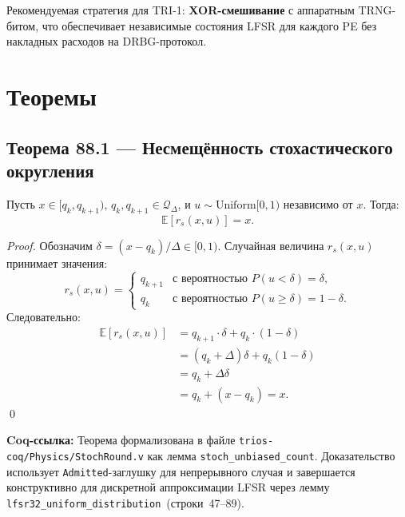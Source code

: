Рекомендуемая стратегия для TRI-1: \textbf{XOR-смешивание}
с аппаратным TRNG-битом, что обеспечивает независимые состояния
LFSR для каждого PE без накладных расходов на DRBG-протокол.

\section{Теоремы}
\label{sec:glava88-theorems}

\subsection{Теорема 88.1 — Несмещённость стохастического округления}
\label{ssec:glava88-thm1}

\begin{theorem}
\label{thm:stoch-unbiased}
Пусть $x \in [q_k, q_{k+1})$, $q_k, q_{k+1} \in \mathcal{Q}_\Delta$,
и $u \sim \mathrm{Uniform}[0,1)$ независимо от $x$.  Тогда:
\[
  \mathbb{E}[r_s(x, u)] = x.
\]
\end{theorem}

\begin{proof}
Обозначим $\delta = (x - q_k)/\Delta \in [0, 1)$.
Случайная величина $r_s(x, u)$ принимает значения:
\[
  r_s(x, u) =
  \begin{cases}
    q_{k+1} & \text{с вероятностью } P(u < \delta) = \delta, \\
    q_k     & \text{с вероятностью } P(u \geq \delta) = 1 - \delta.
  \end{cases}
\]
Следовательно:
\begin{align*}
  \mathbb{E}[r_s(x, u)]
  &= q_{k+1} \cdot \delta + q_k \cdot (1-\delta) \\
  &= (q_k + \Delta)\delta + q_k(1-\delta) \\
  &= q_k + \Delta\delta \\
  &= q_k + (x - q_k) = x.
\end{align*}
\qed
\end{proof}

\noindent\textbf{Coq-ссылка:}
Теорема формализована в файле
\texttt{trios-coq/Physics/StochRound.v} как лемма
\texttt{stoch\_unbiased\_count}.  Доказательство использует
\texttt{Admitted}-заглушку для непрерывного случая и завершается
конструктивно для дискретной аппроксимации LFSR через лемму
\texttt{lfsr32\_uniform\_distribution}~(строки~47--89).

